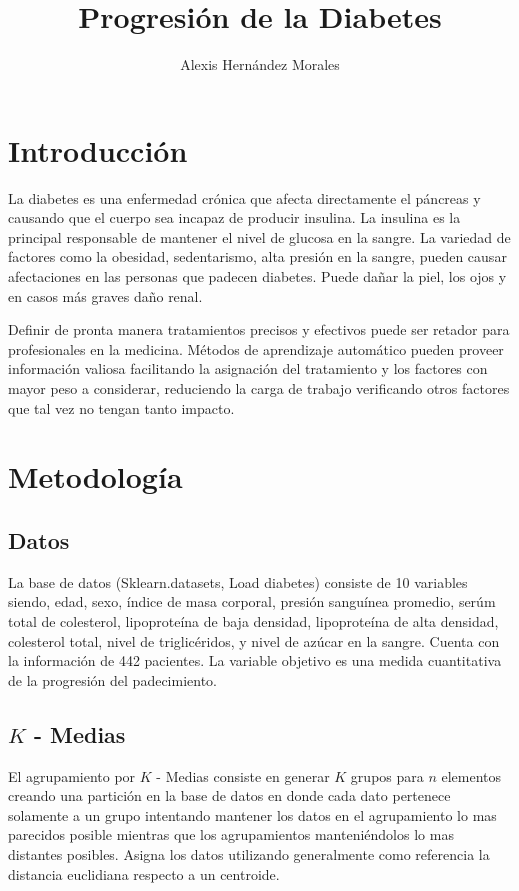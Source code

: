 \documentclass{article}
\title{Progresión de la Diabetes}
\author{Alexis Hernández Morales}
\affil{Facultad de Ciencias Físico Matemáticas, Universidad Autónoma de Nuevo León, San Nicolás de los Garza, México.}
\date{}
\begin{document}
\maketitle

\section{Introducción}
La diabetes es una enfermedad crónica que afecta directamente el páncreas y causando que el cuerpo sea incapaz de producir insulina. La insulina es la principal responsable de mantener el nivel de glucosa en la sangre. La variedad de factores como la obesidad, sedentarismo, alta presión en la sangre, pueden causar afectaciones en las personas que padecen diabetes. Puede dañar la piel, los ojos y en casos más graves daño renal.

Definir de pronta manera tratamientos precisos y efectivos puede ser retador para profesionales en la medicina. Métodos de aprendizaje automático pueden proveer información valiosa facilitando la asignación del tratamiento y los factores con mayor peso a considerar, reduciendo la carga de trabajo verificando otros factores que tal vez no tengan tanto impacto.

\section{Metodología}

\subsection{Datos}
La base de datos (Sklearn.datasets, Load diabetes) consiste de 10 variables siendo, edad, sexo, índice de masa corporal, presión sanguínea promedio, serúm total de colesterol, lipoproteína de baja densidad, lipoproteína de alta densidad, colesterol total, nivel de triglicéridos, y nivel de azúcar en la sangre. Cuenta con la información de 442 pacientes. La variable objetivo es una medida cuantitativa de la progresión del padecimiento.

\subsection{$K$ - Medias}
El agrupamiento por $K$ - Medias consiste en generar $K$ grupos para $n$ elementos creando una partición en la base de datos en donde cada dato pertenece solamente a un grupo intentando mantener los datos en el agrupamiento lo mas parecidos posible mientras que los agrupamientos manteniéndolos lo mas distantes posibles. Asigna los datos utilizando generalmente como referencia la distancia euclidiana respecto a un centroide.
\end{document}
